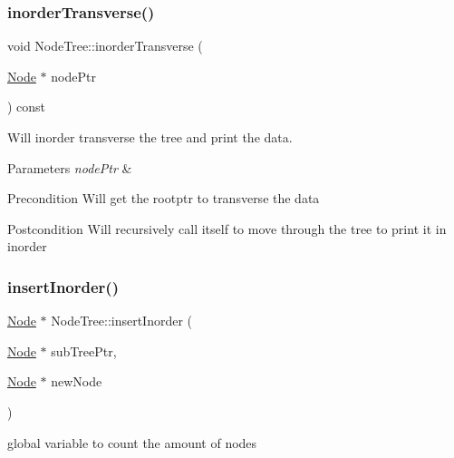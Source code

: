 \subsubsection{\texorpdfstring{inorder\+Transverse()}{inorderTransverse()}}
{\footnotesize\ttfamily void Node\+Tree\+::inorder\+Transverse (\begin{DoxyParamCaption}\item[{\mbox{\hyperlink{class_node}{Node}} $\ast$}]{node\+Ptr }\end{DoxyParamCaption}) const}



Will inorder transverse the tree and print the data. 


\begin{DoxyParams}{Parameters}
{\em node\+Ptr} & \\
\hline
\end{DoxyParams}
\begin{DoxyPrecond}{Precondition}
Will get the rootptr to transverse the data 
\end{DoxyPrecond}
\begin{DoxyPostcond}{Postcondition}
Will recursively call itself to move through the tree to print it in inorder 
\end{DoxyPostcond}
\mbox{\label{class_node_tree_ae6d1c0d70fc02fea199e9e7a81491d83}} 
\subsubsection{\texorpdfstring{insert\+Inorder()}{insertInorder()}}
{\footnotesize\ttfamily \mbox{\hyperlink{class_node}{Node}} $\ast$ Node\+Tree\+::insert\+Inorder (\begin{DoxyParamCaption}\item[{\mbox{\hyperlink{class_node}{Node}} $\ast$}]{sub\+Tree\+Ptr,  }\item[{\mbox{\hyperlink{class_node}{Node}} $\ast$}]{new\+Node }\end{DoxyParamCaption})}



global variable to count the amount of nodes 

